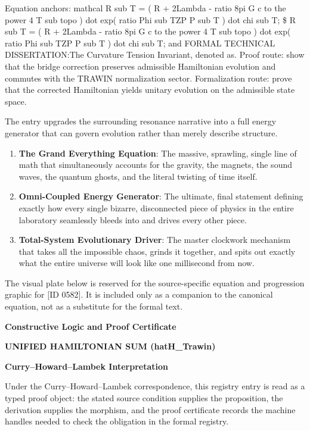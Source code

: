 Equation anchors: mathcal R sub T = ( R + 2Lambda - ratio 8pi G c to the power 4 T sub topo ) dot exp( ratio Phi sub TZP P sub T ) dot chi sub T; \$ R sub T = ( R + 2Lambda - ratio 8pi G c to the power 4 T sub topo ) dot exp( ratio Phi sub TZP P sub T ) dot chi sub T; and FORMAL TECHNICAL DISSERTATION:The Curvature Tension Invariant, denoted as. Proof route: show that the bridge correction preserves admissible Hamiltonian evolution and commutes with the TRAWIN normalization sector. Formalization route: prove that the corrected Hamiltonian yields unitary evolution on the admissible state space.

The entry upgrades the surrounding resonance narrative into a full energy generator that can govern evolution rather than merely describe structure.
\endgroup

\begin{enumerate}[leftmargin=1.6em,itemsep=6pt,topsep=4pt]
\item \textbf{The Grand Everything Equation}: The massive, sprawling, single line of math that simultaneously accounts for the gravity, the magnets, the sound waves, the quantum ghosts, and the literal twisting of time itself.
\item \textbf{Omni-Coupled Energy Generator}: The ultimate, final statement defining exactly how every single bizarre, disconnected piece of physics in the entire laboratory seamlessly bleeds into and drives every other piece.
\item \textbf{Total-System Evolutionary Driver}: The master clockwork mechanism that takes all the impossible chaos, grinds it together, and spits out exactly what the entire universe will look like one millisecond from now.
\end{enumerate}

\begingroup\footnotesize\sloppy
The visual plate below is reserved for the source-specific equation and progression graphic for [ID 0582]. It is included only as a companion to the canonical equation, not as a substitute for the formal text.
\par\endgroup
\ifTZPDarkEdition
{}
\fi

\clearpage
\begingroup\tzpsupportsetup
\noindent\textbf{\fontsize{10.8pt}{12.8pt}\selectfont [ID 0582] Constructive Logic and Proof Certificate}\par
\noindent\textbf{\fontsize{10pt}{12pt}\selectfont UNIFIED HAMILTONIAN SUM (hatH\_Trawin)}\par
\vspace{0.45em}
\begingroup
\footnotesize
\setlength{\parskip}{0.22em}
\setlength{\parindent}{0pt}
\noindent\textbf{Curry--Howard--Lambek Interpretation}\par
Under the Curry--Howard--Lambek correspondence, this registry entry is read as a typed proof
object: the stated source condition supplies the proposition, the derivation supplies the
morphism, and the proof certificate records the machine handles needed to check the obligation
in the formal registry.

